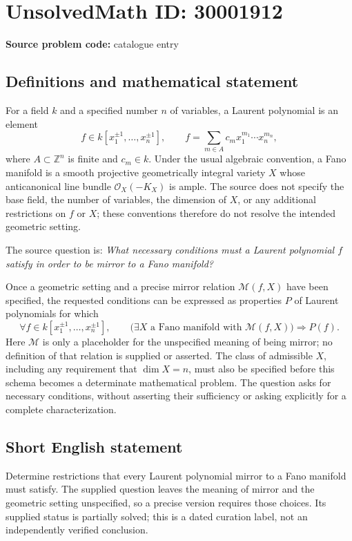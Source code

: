 \documentclass[11pt]{article}
\newcommand{\Z}{\mathbb{Z}}
\begin{document}
\section*{UnsolvedMath ID: 30001912}
\textbf{Source problem code:} catalogue entry
\subsection{Definitions and mathematical statement}
For a field \(k\) and a specified number \(n\) of variables, a Laurent polynomial is an element
\[
 f\in k[x_1^{\pm1},\ldots,x_n^{\pm1}],\qquad
 f=\sum_{m\in A}c_m x_1^{m_1}\cdots x_n^{m_n},
\]
where \(A\subset\Z^n\) is finite and \(c_m\in k\). Under the usual algebraic convention, a Fano manifold is a smooth projective geometrically integral variety \(X\) whose anticanonical line bundle \(\mathcal O_X(-K_X)\) is ample. The source does not specify the base field, the number of variables, the dimension of \(X\), or any additional restrictions on \(f\) or \(X\); these conventions therefore do not resolve the intended geometric setting.

The source question is: \emph{What necessary conditions must a Laurent polynomial \(f\) satisfy in order to be mirror to a Fano manifold?}

Once a geometric setting and a precise mirror relation \(\mathcal M(f,X)\) have been specified, the requested conditions can be expressed as properties \(P\) of Laurent polynomials for which
\[
 \forall f\in k[x_1^{\pm1},\ldots,x_n^{\pm1}],\qquad
 \bigl(\exists X\text{ a Fano manifold with }\mathcal M(f,X)\bigr)
 \Longrightarrow P(f).
\]
Here \(\mathcal M\) is only a placeholder for the unspecified meaning of being mirror; no definition of that relation is supplied or asserted. The class of admissible \(X\), including any requirement that \(\dim X=n\), must also be specified before this schema becomes a determinate mathematical problem. The question asks for necessary conditions, without asserting their sufficiency or asking explicitly for a complete characterization.
\subsection{Short English statement}
Determine restrictions that every Laurent polynomial mirror to a Fano manifold must satisfy. The supplied question leaves the meaning of mirror and the geometric setting unspecified, so a precise version requires those choices. Its supplied status is partially solved; this is a dated curation label, not an independently verified conclusion.
\end{document}
